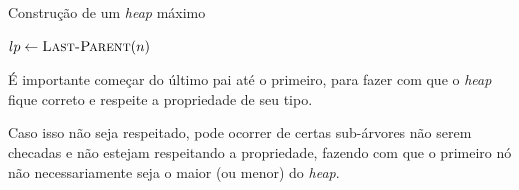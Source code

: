 \documentclass[t, 10pt]{beamer}
\begin{document}
  \begin{frame}{Construção de um \emph{heap} máximo}
    \begin{center}
    \begin{minipage}{0.57\textwidth}
    \begin{algorithm}[H]
      \caption{$\textsc{Build-Max-Heap}(v,n)$}
      $lp \leftarrow \textsc{Last-Parent}(n)$ \\
    \end{algorithm}
    \end{minipage}
    \end{center}

    É importante começar do último pai até o primeiro, para fazer com
    que o \emph{heap} fique correto e respeite a propriedade de seu tipo. \footnotemark
    
    Caso isso não seja respeitado, pode ocorrer de certas sub-árvores não serem checadas
    e não estejam respeitando a propriedade, fazendo com que o primeiro nó não necessariamente
    seja o maior (ou menor) do \emph{heap}.
    
  \end{frame}
  
\end{document}
